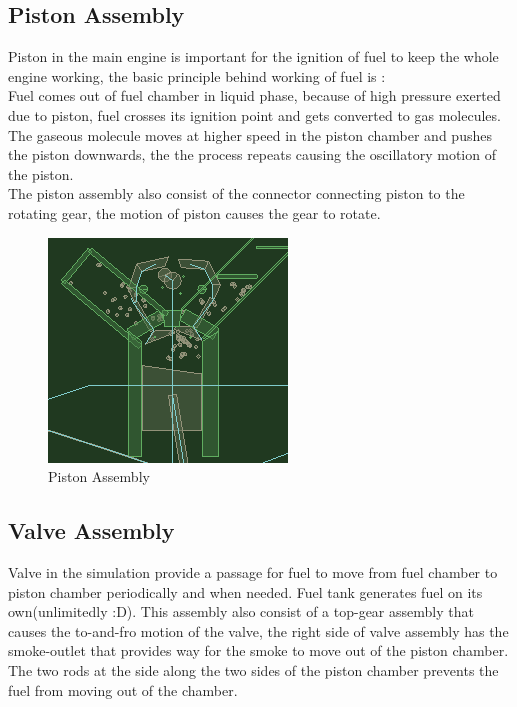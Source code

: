 \documentclass[12pt,a4paper]{report}
\begin{document}
\subsection*{Piston Assembly}

Piston in the main engine is important for the ignition of fuel to keep the whole engine working, the basic principle behind working of fuel is :  \\
Fuel comes out of fuel chamber in liquid phase, because of high pressure exerted due to piston, fuel crosses its ignition point and gets converted to gas molecules. The gaseous molecule moves at higher speed in the piston chamber and pushes the piston downwards, the the process repeats causing the oscillatory motion of the piston. \\
The piston assembly also consist of the connector connecting piston to the rotating gear, the motion of piston causes the gear to rotate. \cite{piston} \\

\begin{figure}[ht!]
\centering
\includegraphics[scale=0.7]{pistonAssembly}
\caption{Piston Assembly}
\end{figure}


\subsection*{Valve Assembly}

Valve in the simulation provide a passage for fuel to move from fuel chamber to piston  chamber periodically and when needed. Fuel tank generates fuel on its own(unlimitedly :D). This assembly also consist of a top-gear assembly that causes the to-and-fro motion of the valve, the right side of valve assembly has the smoke-outlet that provides way for the smoke to move out of the piston chamber. The two rods at the side along the two sides of the piston chamber prevents the fuel from moving out of the chamber.
\end{document}
